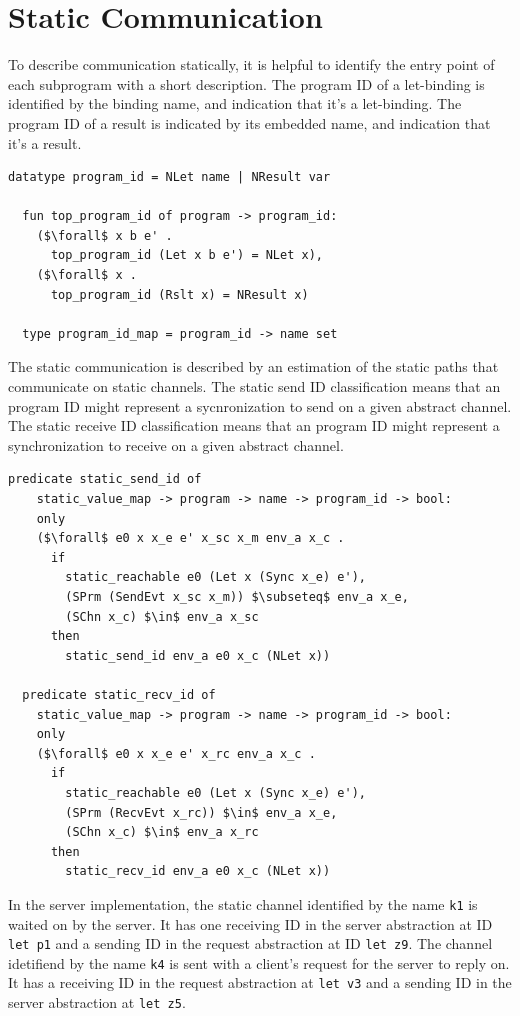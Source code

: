 \documentclass{article}
\begin{document}
\section{Static Communication}
To describe communication statically, it is helpful to identify the entry
point of each subprogram with a short description. The program ID of a let-binding is
identified by the binding name, and indication that it's a let-binding. The program ID
of a result is indicated by its embedded name, and indication that it's a result.

\begin{lstlisting}[language=logic, mathescape]
  datatype program_id = NLet name | NResult var

  fun top_program_id of program -> program_id:
    ($\forall$ x b e' . 
      top_program_id (Let x b e') = NLet x),
    ($\forall$ x . 
      top_program_id (Rslt x) = NResult x)

  type program_id_map = program_id -> name set

\end{lstlisting}

The static communication is described by an estimation of the static paths that communicate on
static channels.
The static send ID classification means that an program ID might represent a
sycnronization to send on a given abstract channel.
The static receive ID classification means that an program ID might represent a
synchronization to receive on a given abstract channel. 

\begin{lstlisting}[language=logic, mathescape]
  predicate static_send_id of
    static_value_map -> program -> name -> program_id -> bool:
    only
    ($\forall$ e0 x x_e e' x_sc x_m env_a x_c .
      if
        static_reachable e0 (Let x (Sync x_e) e'),
        (SPrm (SendEvt x_sc x_m)) $\subseteq$ env_a x_e, 
        (SChn x_c) $\in$ env_a x_sc
      then
        static_send_id env_a e0 x_c (NLet x))

  predicate static_recv_id of
    static_value_map -> program -> name -> program_id -> bool:
    only
    ($\forall$ e0 x x_e e' x_rc env_a x_c .
      if
        static_reachable e0 (Let x (Sync x_e) e'),
        (SPrm (RecvEvt x_rc)) $\in$ env_a x_e, 
        (SChn x_c) $\in$ env_a x_rc 
      then
        static_recv_id env_a e0 x_c (NLet x))
  \end{lstlisting}


In the server implementation, the static channel identified by the name \lstinline{k1} is waited on
by the server.  It has
one receiving ID in the server abstraction
at ID \lstinline[language=sugar_lang]{let p1} and a sending ID
in the request abstraction at ID \lstinline[language=sugar_lang]{let z9}.
The channel idetifiend by the name \lstinline{k4} is sent with a client's request for
the server to reply on. It has a receiving ID in the request abstraction at
\lstinline[language=sugar_lang]{let v3} and a sending ID in the server abstraction at
\lstinline[language=sugar_lang]{let z5}.
\end{document}
